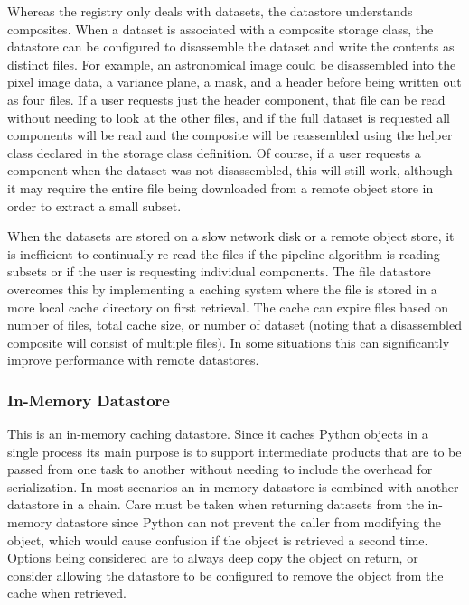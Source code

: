 \documentclass[]{spie}
\begin{document}
Whereas the registry only deals with datasets, the datastore understands composites.
When a dataset is associated with a composite storage class, the datastore can be configured to disassemble the dataset and write the contents as distinct files.
For example, an astronomical image could be disassembled into the pixel image data, a variance plane, a mask, and a header before being written out as four files.
If a user requests just the header component, that file can be read without needing to look at the other files, and if the full dataset is requested all components will be read and the composite will be reassembled using the helper class declared in the storage class definition.
Of course, if a user requests a component when the dataset was not disassembled, this will still work, although it may require the entire file being downloaded from a remote object store in order to extract a small subset.

When the datasets are stored on a slow network disk or a remote object store, it is inefficient to continually re-read the files if the pipeline algorithm is reading subsets or if the user is requesting individual components.
The file datastore overcomes this by implementing a caching system where the file is stored in a more local cache directory on first retrieval.
The cache can expire files based on number of files, total cache size, or number of dataset (noting that a disassembled composite will consist of multiple files).
In some situations this can significantly improve performance with remote datastores.

\subsubsection{In-Memory Datastore}

This is an in-memory caching datastore.
Since it caches Python objects in a single process its main purpose is to support intermediate products that are to be passed from one task to another without needing to include the overhead for serialization.
In most scenarios an in-memory datastore is combined with another datastore in a chain.
Care must be taken when returning datasets from the in-memory datastore since Python can not prevent the caller from modifying the object, which would cause confusion if the object is retrieved a second time.
Options being considered are to always deep copy the object on return, or consider allowing the datastore to be configured to remove the object from the cache when retrieved.
\end{document}
